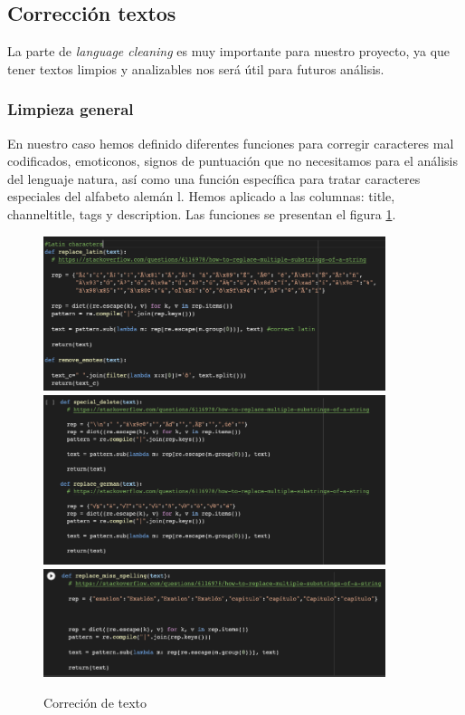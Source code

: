 \documentclass[a4paper,12pt]{article}
\begin{document}
\subsection{Correcci\'on  textos}
La parte de {\itshape language cleaning} es muy importante para nuestro proyecto, ya que tener textos limpios y analizables nos ser\'a \'util para futuros   an\'alisis.


\subsubsection{Limpieza general}

En nuestro caso hemos definido diferentes funciones para corregir caracteres mal codificados, emoticonos, signos de puntuaci\'on que no necesitamos para el an\'alisis del lenguaje natura, as\'i como una funci\'on espec\'ifica para tratar caracteres especiales del alfabeto alem\'an l. Hemos aplicado a las columnas: title, channel{\textunderscore}title,  tags y description. Las funciones se presentan el figura \ref{fig:corrtext}.



\begin{figure}[h!]
\centering
\includegraphics[width=10cm]{latin_characters.png}\\
\includegraphics[width=10cm]{german_characters.png}\\
\includegraphics[width=10cm]{misspellings.png}
\caption{Correci\'on de texto}
\label{fig:corrtext}
\end{figure}
\end{document}
